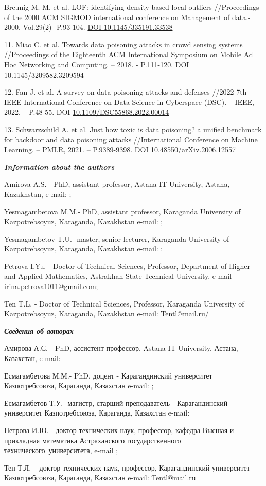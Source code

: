 \begin{references}
Breunig M. M. et al. LOF: identifying density-based local outliers
//Proceedings of the 2000 ACM SIGMOD international conference on
Management of data.- 2000.-Vol.29(2)- P.93-104.
\href{https://doi.org/10.1145/335191.335388}{DOI 10.1145/335191.33538}

11. Miao C. et al. Towards data poisoning attacks in crowd sensing
systems //Proceedings of the Eighteenth ACM International Symposium on
Mobile Ad Hoc Networking and Computing. -- 2018. - P.111-120. DOI
10.1145/3209582.3209594

12. Fan J. et al. A survey on data poisoning attacks and defenses //2022
7th IEEE International Conference on Data Science in Cyberspace (DSC).
-- IEEE, 2022. -- P.48-55. DOI
\href{http://dx.doi.org/10.1109/DSC55868.2022.00014}{10.1109/DSC55868.2022.00014}

13. Schwarzschild A. et al. Just how toxic is data poisoning? a unified
benchmark for backdoor and data poisoning attacks //International
Conference on Machine Learning. -- PMLR, 2021. -- P.9389-9398. DOI
10.48550/arXiv.2006.12557
\end{references}

\begin{authorinfo}
\emph{{\bfseries Information about the authors}}

Amirova A.S. - PhD, assistant professor, Astana IT University, Astana,
Kazakhstan, e-mail:
\href{mailto:akzhibek.amirova@astanait.edu.kz}{};

Yesmagambetova M.M.- PhD, assistant professor, Karaganda University of
Kazpotrebsoyuz, Karaganda, Kazakhstan e-mail:
\href{mailto:marzhan1983@mail.ru}{};

Yesmagambetov T.U.- master, senior lecturer, Karaganda University of
Kazpotrebsoyuz, Karaganda, Kazakhstan e-mail:
\href{mailto:Timur198300@mail.ru}{};

Petrova I.Yu. - Doctor of Technical Sciences, Professor, Department of
Higher and Applied Mathematics, Astrakhan State Technical University,
e-mail irina.petrova1011@gmail.com;

Ten T.L. - Doctor of Technical Sciences, Professor, Karaganda University
of Kazpotrebsoyuz, Karaganda, Kazakhstan e-mail: Tentl@mail.ru/

\emph{{\bfseries Сведения об авторах}}

Амирова А.С. - PhD, ассистент профессор, Astana IT University, Астана,
Казахстан, e-mail:

Есмагамбетова М.М.- PhD, доцент - Карагандинский университет
Казпотребсоюза, Караганда, Казахстан e-mail:
\href{mailto:marzhan1983@mail.ru}{};

Есмагамбетов Т.У.- магистр, старший преподаватель - Карагандинский
университет Казпотребсоюза, Караганда, Казахстан e-mail:

Петрова И.Ю. - доктор технических наук, профессор, кафедра Высшая и
прикладная математика Астраханского государственного
технического~университета, e-mail
\href{mailto:irina.petrova1011@gmail.com}{};

Тен Т.Л. -- доктор технических наук, профессор, Карагандинский
университет Казпотребсоюза, Караганда, Казахстан e-mail: Tentl@mail.ru
\end{authorinfo}
